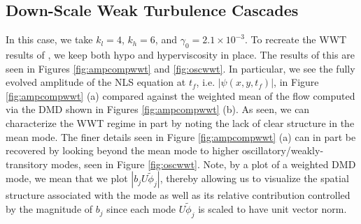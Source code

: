 \documentclass[a4paper,11pt]{article}
\begin{document}
\subsection*{Down-Scale Weak Turbulence Cascades}
In this case, we take $k_{l}=4$, $k_{h}=6$, and $\gamma_{0}=2.1\times 10^{-3}$.  To recreate the WWT results of \cite{nazarenko2}, we keep both hypo and hyperviscosity in place.  The results of this are seen in Figures \ref{fig:ampcompwwt} and \ref{fig:oscwwt}.  In particular, we see the fully evolved amplitude of the NLS equation at $t_{f}$, i.e. $|\psi(x,y,t_{f})|$, in Figure \ref{fig:ampcompwwt} (a) compared against the weighted mean of the flow computed via the DMD shown in  Figures \ref{fig:ampcompwwt} (b).  As seen, we can characterize the WWT regime in part by noting the lack of clear structure in the mean mode.  The finer details seen in Figure \ref{fig:ampcompwwt} (a) can in part be recovered by looking beyond the mean mode to higher oscillatory/weakly-transitory modes, seen in Figure \ref{fig:oscwwt}.  Note, by a plot of a weighted DMD mode, we mean that we plot $\left|b_{j}U\tilde{\phi}_{j}\right|$, thereby allowing us to visualize the spatial structure associated with the mode as well as its relative contribution controlled by the magnitude of $b_{j}$ since each mode $U\tilde{\phi}_{j}$ is scaled to have unit vector norm.  
\end{document}
